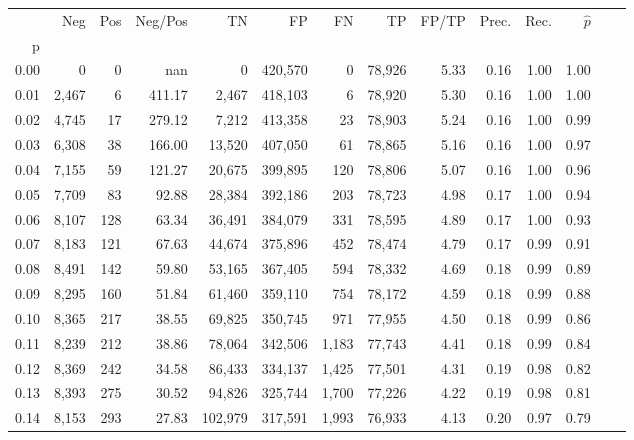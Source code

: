 \begin{tabular}{rrrrrrrrrrrrrr}
\toprule
{} &    Neg &    Pos & Neg/Pos &       TN &       FP &      FN &      TP & FP/TP & Prec. &  Rec. & $\hat{p}$ \\
p    &        &        &         &          &          &         &         &       &       &       &           \\
\midrule
0.00 &      0 &      0 &     nan &        0 &  420,570 &       0 &  78,926 &  5.33 &  0.16 &  1.00 &      1.00 \\
0.01 &  2,467 &      6 &  411.17 &    2,467 &  418,103 &       6 &  78,920 &  5.30 &  0.16 &  1.00 &      1.00 \\
0.02 &  4,745 &     17 &  279.12 &    7,212 &  413,358 &      23 &  78,903 &  5.24 &  0.16 &  1.00 &      0.99 \\
0.03 &  6,308 &     38 &  166.00 &   13,520 &  407,050 &      61 &  78,865 &  5.16 &  0.16 &  1.00 &      0.97 \\
0.04 &  7,155 &     59 &  121.27 &   20,675 &  399,895 &     120 &  78,806 &  5.07 &  0.16 &  1.00 &      0.96 \\
0.05 &  7,709 &     83 &   92.88 &   28,384 &  392,186 &     203 &  78,723 &  4.98 &  0.17 &  1.00 &      0.94 \\
0.06 &  8,107 &    128 &   63.34 &   36,491 &  384,079 &     331 &  78,595 &  4.89 &  0.17 &  1.00 &      0.93 \\
0.07 &  8,183 &    121 &   67.63 &   44,674 &  375,896 &     452 &  78,474 &  4.79 &  0.17 &  0.99 &      0.91 \\
0.08 &  8,491 &    142 &   59.80 &   53,165 &  367,405 &     594 &  78,332 &  4.69 &  0.18 &  0.99 &      0.89 \\
0.09 &  8,295 &    160 &   51.84 &   61,460 &  359,110 &     754 &  78,172 &  4.59 &  0.18 &  0.99 &      0.88 \\
0.10 &  8,365 &    217 &   38.55 &   69,825 &  350,745 &     971 &  77,955 &  4.50 &  0.18 &  0.99 &      0.86 \\
0.11 &  8,239 &    212 &   38.86 &   78,064 &  342,506 &   1,183 &  77,743 &  4.41 &  0.18 &  0.99 &      0.84 \\
0.12 &  8,369 &    242 &   34.58 &   86,433 &  334,137 &   1,425 &  77,501 &  4.31 &  0.19 &  0.98 &      0.82 \\
0.13 &  8,393 &    275 &   30.52 &   94,826 &  325,744 &   1,700 &  77,226 &  4.22 &  0.19 &  0.98 &      0.81 \\
0.14 &  8,153 &    293 &   27.83 &  102,979 &  317,591 &   1,993 &  76,933 &  4.13 &  0.20 &  0.97 &      0.79 \\

\end{tabular}
